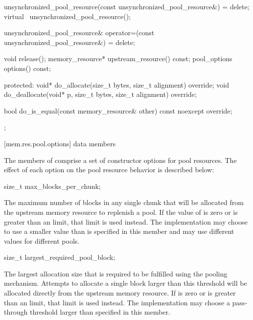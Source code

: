 \begin{codeblock}
{{    unsynchronized_pool_resource(const unsynchronized_pool_resource&) = delete;
    virtual ~unsynchronized_pool_resource();

    unsynchronized_pool_resource& operator=(const unsynchronized_pool_resource&) = delete;

    void release();
    memory_resource* upstream_resource() const;
    pool_options options() const;

  protected:
    void* do_allocate(size_t bytes, size_t alignment) override;
    void do_deallocate(void* p, size_t bytes, size_t alignment) override;

    bool do_is_equal(const memory_resource& other) const noexcept override;
  };
}
\end{codeblock}

[mem.res.pool.options]{ data members}

\pnum
The members of 
comprise a set of constructor options for pool resources.
The effect of each option on the pool resource behavior is described below:

%
\begin{itemdecl}
size_t max_blocks_per_chunk;
\end{itemdecl}

\begin{itemdescr}
\pnum
The maximum number of blocks in any single chunk that will be allocated
from the upstream memory resource
to replenish a pool.
If the value of  is zero or
is greater than an 
limit, that limit is used instead.
The implementation
may choose to use a smaller value than is specified in this member and
may use different values for different pools.
\end{itemdescr}

%
\begin{itemdecl}
size_t largest_required_pool_block;
\end{itemdecl}

\begin{itemdescr}
\pnum
The largest allocation size that is required to be fulfilled
using the pooling mechanism.
Attempts to allocate a single block larger than this threshold
will be allocated directly from the upstream memory resource.
If  is zero or
is greater than an 
limit, that limit is used instead.
The implementation may choose a pass-through threshold
larger than specified in this member.
\end{itemdescr}

